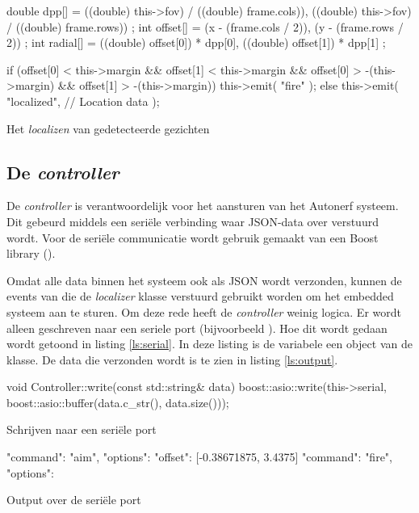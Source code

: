 \begin{listing}[H]
    \begin{cppcode}
    double dpp[] = {
        ((double) this->fov) / ((double) frame.cols)),
        ((double) this->fov) / ((double) frame.rows))
    };
    int offset[] = {
        (x - (frame.cols / 2)),
        (y - (frame.rows / 2))
    };
    int radial[] = {
        ((double) offset[0]) * dpp[0],
        ((double) offset[1]) * dpp[1]
    };

    if (offset[0] < this->margin &&
        offset[1] < this->margin &&
        offset[0] > -(this->margin) &&
        offset[1] > -(this->margin)) {
        this->emit(
            "fire"
        );
    } else {
        this->emit(
            "localized",
            // Location data
        );
    }
    \end{cppcode}
    \caption{Het \emph{localizen} van gedetecteerde gezichten}
    \label{ls:offset}
\end{listing}

\vfill
\pagebreak

\subsection{De \emph{controller}}

De \emph{controller} is verantwoordelijk voor het aansturen van het Autonerf
systeem. Dit gebeurd middels een seriële verbinding waar JSON-data over verstuurd
wordt. Voor de seriële communicatie wordt gebruik gemaakt van een Boost library
().

Omdat alle data binnen het systeem ook als JSON wordt verzonden, kunnen de
events van die de \emph{localizer} klasse verstuurd gebruikt worden om het
embedded systeem aan te sturen. Om deze rede heeft de \emph{controller} weinig
logica. Er wordt alleen geschreven naar een seriele port (bijvoorbeeld ).
Hoe dit wordt gedaan wordt getoond in listing \ref{ls:serial}. In deze listing
is de  variabele een object van de 
klasse. De data die verzonden wordt is te zien in listing \ref{ls:output}.

\begin{listing}[H]
    \begin{cppcode}
    void
    Controller::write(const std::string& data)
    {
        boost::asio::write(this->serial, boost::asio::buffer(data.c_str(), data.size()));
    }
    \end{cppcode}
    \caption{Schrijven naar een seriële port}
    \label{ls:serial}
\end{listing}

\begin{listing}[H]
    \begin{jsoncode}
    {"command": "aim", "options": {"offset": [-0.38671875, 3.4375]}}
    {"command": "fire", "options": {}}
    \end{jsoncode}
    \caption{Output over de seriële port}
    \label{ls:output}
\end{listing}
